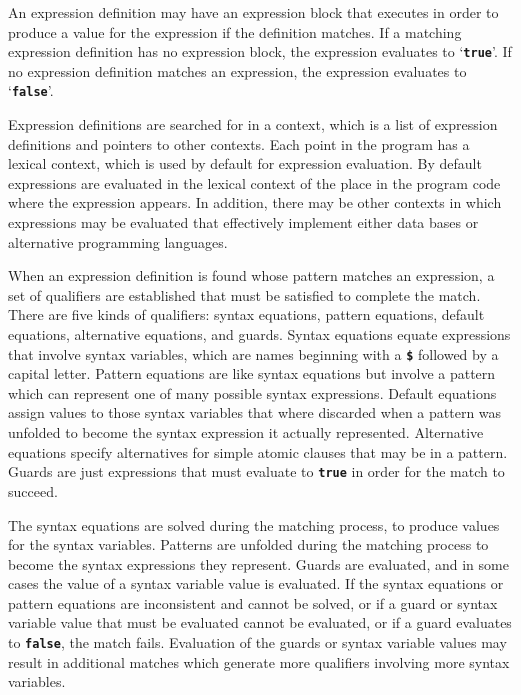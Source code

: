 \documentclass[12pt]{article}
\makeatletter
\newcommand{\TT}[1]{{\tt \bfseries #1}}
\newcommand{\ttkey}[1]{\TT{#1}\index{#1@{\tt #1}}}
\makeatother
\begin{document}
An expression definition may have an expression block that executes
in order to produce a value for the expression if the definition
matches.  If a matching
expression definition has no expression block, the expression
evaluates to `\ttkey{true}'.  If no expression definition matches an
expression, the expression evaluates to `\ttkey{false}'.

Expression definitions are searched for in a context, which is a list
of expression definitions and pointers to other contexts.
Each point in the program has a lexical context, which is used by default
for expression evaluation. 
By default expressions are evaluated in the
lexical context of the place in the program code where the expression
appears.  In addition, there may be other
contexts in which expressions may be evaluated that effectively implement
either data bases or alternative programming languages.

When an expression definition is found whose pattern matches an expression,
a set of qualifiers are established that must be satisfied to
complete the match.  There are five kinds of qualifiers: syntax
equations, pattern equations, default equations, alternative
equations, and guards.
Syntax equations equate expressions that involve syntax variables,
which are names beginning with a \TT{\$} followed by a capital letter.
Pattern equations are like syntax equations but
involve a pattern which can represent one of many possible syntax
expressions.  Default equations assign values to those
syntax variables that where
discarded when a pattern was unfolded to become the syntax expression
it actually represented.  Alternative equations specify alternatives
for simple atomic clauses that may be in a pattern.
Guards are just expressions that must evaluate to
\TT{true} in order for the match to succeed.

The syntax equations are solved during the matching process,
to produce values for the syntax variables.  Patterns are unfolded during
the matching process to become the syntax expressions they represent.
Guards are evaluated, and in some cases the value of a syntax variable
value is evaluated.
If the syntax equations or pattern equations are inconsistent and
cannot be solved, or if a guard or syntax variable value that must be
evaluated cannot be evaluated, or if a guard evaluates to \TT{false},
the match fails.  Evaluation of the guards or syntax variable values
may result in additional matches which generate more
qualifiers involving more syntax variables.
\end{document}
